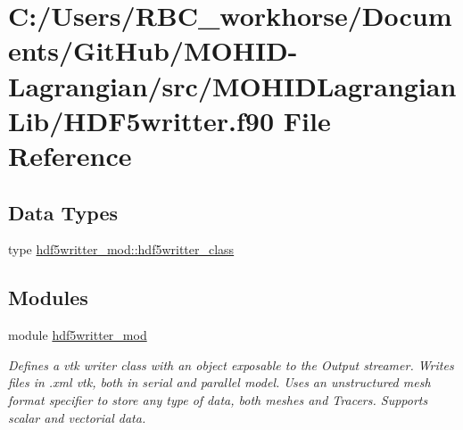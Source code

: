 \hypertarget{_h_d_f5writter_8f90}{}\section{C\+:/\+Users/\+R\+B\+C\+\_\+workhorse/\+Documents/\+Git\+Hub/\+M\+O\+H\+I\+D-\/\+Lagrangian/src/\+M\+O\+H\+I\+D\+Lagrangian\+Lib/\+H\+D\+F5writter.f90 File Reference}
\label{_h_d_f5writter_8f90}
\subsection*{Data Types}
\begin{DoxyCompactItemize}
\item 
type \mbox{\hyperlink{structhdf5writter__mod_1_1hdf5writter__class}{hdf5writter\+\_\+mod\+::hdf5writter\+\_\+class}}
\end{DoxyCompactItemize}
\subsection*{Modules}
\begin{DoxyCompactItemize}
\item 
module \mbox{\hyperlink{namespacehdf5writter__mod}{hdf5writter\+\_\+mod}}
\begin{DoxyCompactList}\small\item\em Defines a vtk writer class with an object exposable to the Output streamer. Writes files in .xml vtk, both in serial and parallel model. Uses an unstructured mesh format specifier to store any type of data, both meshes and Tracers. Supports scalar and vectorial data. \end{DoxyCompactList}\end{DoxyCompactItemize}

